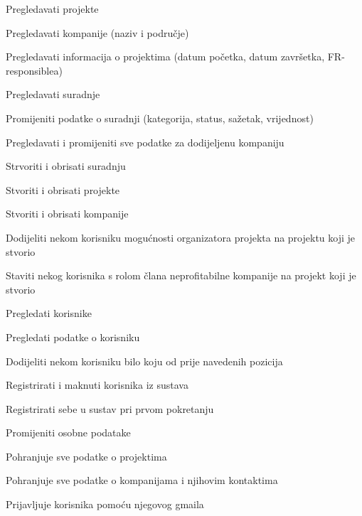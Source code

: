 \begin{packed_enum}
\begin{packed_enum}
				\end{packed_enum}

				\item  {}

				\begin{packed_enum}

					\item Pregledavati projekte
					\item Pregledavati kompanije (naziv i područje)
					\item Pregledavati informacija o projektima (datum početka, datum završetka, FR- responsiblea)
					\item Pregledavati suradnje
					\item Promijeniti podatke o suradnji (kategorija, status, sažetak, vrijednost)
					\item Pregledavati i promijeniti sve podatke za dodijeljenu kompaniju
					\item Strvoriti i obrisati suradnju
					\item Stvoriti i obrisati projekte
					\item Stvoriti i obrisati kompanije
					\item Dodijeliti nekom korisniku mogućnosti organizatora projekta na projektu koji je stvorio
					\item Staviti nekog korisnika s rolom člana neprofitabilne kompanije na projekt koji je stvorio
					\item Pregledati korisnike
					\item Pregledati podatke o korisniku
					\item Dodijeliti nekom korisniku bilo koju od prije navedenih pozicija
					\item Registrirati i maknuti korisnika iz sustava
					\item Registrirati sebe u sustav pri prvom pokretanju
					\item Promijeniti osobne podatake

				\end{packed_enum}
			
				\item  {}
				
				\begin{packed_enum}
					
					\item Pohranjuje sve podatke o projektima
					\item Pohranjuje sve podatke o kompanijama i njihovim kontaktima
					
				\end{packed_enum}

				\item  {}

				\begin{packed_enum}

					\item Prijavljuje korisnika pomoću njegovog gmaila

				\end{packed_enum}
			\end{packed_enum}
			
